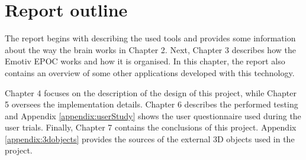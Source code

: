 \section{Report outline}

The report begins with describing the used tools and provides some information about the way the brain works in Chapter 2. Next, Chapter 3 describes how the Emotiv EPOC works and how it is organised. In this chapter, the report also contains an overview of some other applications developed with this technology.

Chapter 4 focuses on the description of the design of this project, while Chapter 5 oversees the implementation details. Chapter 6 describes the performed testing and Appendix \ref{appendix:userStudy} shows the user questionnaire used during the user trials. Finally, Chapter 7 contains the conclusions of this project. Appendix \ref{appendix:3dobjects} provides the sources of the external 3D objects used in the project.